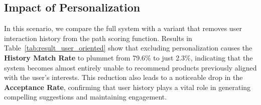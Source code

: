 \subsection{Impact of Personalization}



In this scenario, we compare the full system with a variant that removes user interaction history from the path scoring function. Results in Table~\ref{tab:result_user_oriented} show that excluding personalization causes the \textbf{History Match Rate} to plummet from 79.6\% to just 2.3\%, indicating that the system becomes almost entirely unable to recommend products previously aligned with the user’s interests. This reduction also leads to a noticeable drop in the \textbf{Acceptance Rate}, confirming that user history plays a vital role in generating compelling suggestions and maintaining engagement.



